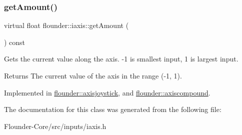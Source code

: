 \subsubsection{\texorpdfstring{get\+Amount()}{getAmount()}}
{\footnotesize\ttfamily virtual float flounder\+::iaxis\+::get\+Amount (\begin{DoxyParamCaption}{ }\end{DoxyParamCaption}) const\hspace{0.3cm}{\ttfamily [pure virtual]}}



Gets the current value along the axis. -\/1 is smallest input, 1 is largest input. 

\begin{DoxyReturn}{Returns}
The current value of the axis in the range (-\/1, 1). 
\end{DoxyReturn}


Implemented in \hyperlink{classflounder_1_1axisjoystick_ae1c3dafedcb9458be0172e83f4197dac}{flounder\+::axisjoystick}, and \hyperlink{classflounder_1_1axiscompound_aad0f38f1a532c269cd0e803953861400}{flounder\+::axiscompound}.



The documentation for this class was generated from the following file\+:\begin{DoxyCompactItemize}
\item 
Flounder-\/\+Core/src/inputs/iaxis.\+h\end{DoxyCompactItemize}
